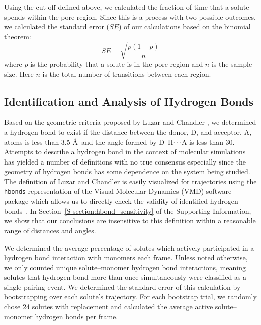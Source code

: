 \documentclass[journal=jpcbfk,manuscript=article]{achemso}
\begin{document}
  Using the cut-off defined above, we calculated the fraction of time
  that a solute spends within the pore region. Since this is a process
  with two possible outcomes, we calculated the standard error ($SE$) of our
  calculations based on the binomial theorem: 
  \begin{equation}
  SE = \sqrt{\dfrac{p(1-p)}{n}}
  \end{equation}
  where $p$ is the probability that a solute is in the pore region and
  $n$ is the sample size. Here $n$ is the total number of transitions
  between each region. 
  
  \subsection{Identification and Analysis of Hydrogen Bonds}\label{method:hbonds}  %

  Based on the geometric criteria proposed by Luzar and Chandler 
  \cite{luzar_effect_1996}, we determined a hydrogen bond to exist if the
  distance between the donor, D, and acceptor, A, atoms is less than 
  3.5 \AA~and the angle formed by D--H$\cdot\cdot\cdot$A is less than 30\degree. Attempts
  to describe a hydrogen bond in the context of molecular simulations has
  yielded a number of definitions with no true consensus 
  \cite{prada-gracia_quest_2013} especially since the geometry of hydrogen
  bonds has some dependence on the system being studied. The definition of
  Luzar and Chandler is easily visualized for trajectories using the 
  \texttt{hbonds} representation of the Visual Molecular Dynamics (VMD) software 
  package which allows us to directly check the validity of identified hydrogen 
  bonds~\cite{humphrey_VMD:_1996}. In Section~\ref{S-section:hbond_sensitivity} 
  of the Supporting Information, we show that our conclusions are insensitive
  to this definition within a reasonable range of distances and angles. 
  
  We determined the average percentage of solutes
  which actively participated in a hydrogen bond interaction with monomers 
  each frame. Unless noted otherwise, we only counted unique solute--monomer
  hydrogen bond interactions, meaning solutes that hydrogen bond more than 
  once simultaneously were classified as a single pairing event. We determined
  the standard error of this calculation by bootstrapping over each solute's 
  trajectory. For each bootstrap trial, we randomly chose 24 solutes with 
  replacement and calculated the average active solute--monomer hydrogen bonds per frame.
\end{document}
